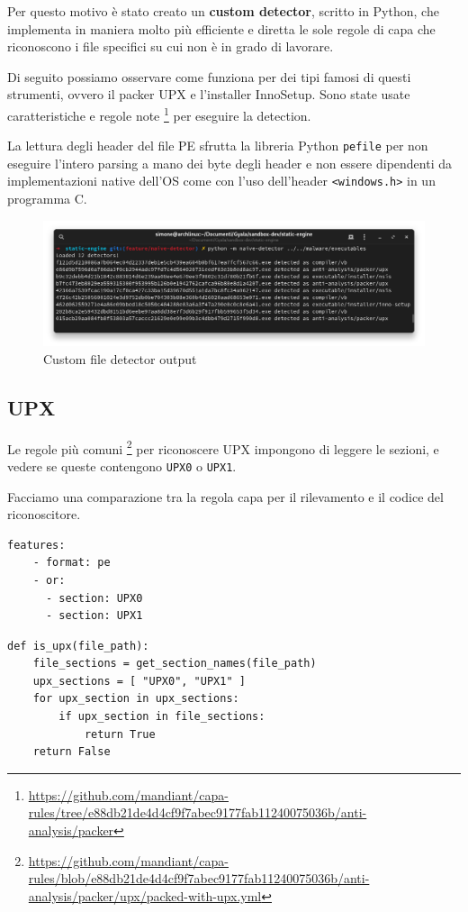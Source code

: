 Per questo motivo è stato creato un \textbf{custom detector}, scritto in Python, che implementa in maniera molto più efficiente e diretta le sole regole di capa che riconoscono i file specifici su cui non è in grado di lavorare.

Di seguito possiamo osservare come funziona per dei tipi famosi di questi strumenti, ovvero il packer UPX e l'installer InnoSetup.
Sono state usate caratteristiche e regole note
\footnote{\url{https://github.com/mandiant/capa-rules/tree/e88db21de4d4cf9f7abec9177fab11240075036b/anti-analysis/packer}}
per eseguire la detection.

La lettura degli header del file PE sfrutta la libreria Python \texttt{pefile} per non eseguire l'intero parsing a mano dei byte degli header e non essere dipendenti da implementazioni native dell'OS come con l'uso dell'header \texttt{<windows.h>} in un programma C.

\begin{figure}[htbp]
    \centering
    \includegraphics[width=\textwidth]{assets/custom_file_detector_output.png}
    \caption{Custom file detector output}
\end{figure}

\subsection{UPX}
Le regole più comuni
\footnote{\url{https://github.com/mandiant/capa-rules/blob/e88db21de4d4cf9f7abec9177fab11240075036b/anti-analysis/packer/upx/packed-with-upx.yml}}
per riconoscere UPX impongono di leggere le sezioni, e vedere se queste contengono \texttt{UPX0} o \texttt{UPX1}.

Facciamo una comparazione tra la regola capa per il rilevamento e il codice del riconoscitore.

\noindent\begin{minipage}{.35\textwidth}
       \begin{verbatim}
features:
    - format: pe
    - or:
      - section: UPX0
      - section: UPX1
       \end{verbatim}
\end{minipage}
\begin{minipage}{.4\textwidth}
       \begin{verbatim}
def is_upx(file_path):
    file_sections = get_section_names(file_path)
    upx_sections = [ "UPX0", "UPX1" ]
    for upx_section in upx_sections:
        if upx_section in file_sections:
            return True
    return False
       \end{verbatim}
\end{minipage}

